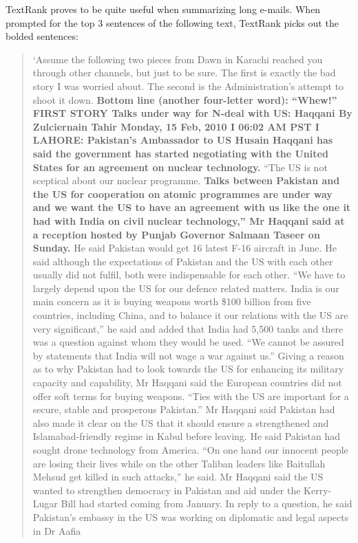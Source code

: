 TextRank proves to be quite useful when summarizing long e-mails.
When prompted for the top 3 sentences of the following text, TextRank picks out the bolded sentences:

\begin{quotation}
`Assume the following two pieces from Dawn in Karachi reached you through other channels, but just to be sure.
The first is exactly the bad story I was worried about.
The second is the Administration's attempt to shoot it down.
\textbf{Bottom line (another four-letter word): ``Whew!''
FIRST STORY
Talks under way for N-deal with US: Haqqani
By Zulciernain Tahir
Monday, 15 Feb, 2010 I 06:02 AM PST I
LAHORE: Pakistan's Ambassador to US Husain Haqqani has said the government has started negotiating with the United
States for an agreement on nuclear technology.}
``The US is not sceptical about our nuclear programme. \textbf{Talks between Pakistan and the US for cooperation on atomic
programmes are under way and we want the US to have an agreement with us like the one it had with India on civil
nuclear technology,'' Mr Haqqani said at a reception hosted by Punjab Governor Salmaan Taseer on Sunday.}
He said Pakistan would get 16 latest F-16 aircraft in June. He said although the expectations of Pakistan and the US with
each other usually did not fulfil, both were indispensable for each other.
``We have to largely depend upon the US for our defence related matters.
India is our main concern as it is buying weapons worth \$100 billion from five countries, including China, and to balance
it our relations with the US are very significant,'' he said and added that India had 5,500 tanks and there was a question
against whom they would be used. ``We cannot be assured by statements that India will not wage a war against us.''
Giving a reason as to why Pakistan had to look towards the US for enhancing its military capacity and capability, Mr
Haqqani said the European countries did not offer soft terms for buying weapons. ``Ties with the US are important for a
secure, stable and prosperous Pakistan.''
Mr Haqqani said Pakistan had also made it clear on the US that it should ensure a strengthened and Islamabad-friendly
regime in Kabul before leaving.
He said Pakistan had sought drone technology from America. ``On one hand our innocent people are losing their lives
while on the other Taliban leaders like Baitullah Mehsud get killed in such attacks,'' he said.
Mr Haqqani said the US wanted to strengthen democracy in Pakistan and aid under the Kerry-Lugar Bill had started
coming from January.
In reply to a question, he said Pakistan's embassy in the US was working on diplomatic and legal aspects in Dr Aafia

\end{quotation}
